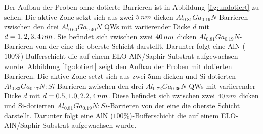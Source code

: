 \noindent 
Der Aufbau der Proben ohne dotierte Barrieren ist in Abbildung \ref{fig:undotiert} zu sehen.
Die aktive Zone setzt sich aus zwei $5 \thinspace nm$ dicken $ Al_{0.81}Ga_{0.19}N$-Barrieren zwischen den drei $ Al_{0.60}Ga_{0.40}N$ QWs mit variierender Dicke $d$ mit $d=1,2,3,4 \thinspace nm$. Sie befindet sich zwischen zwei $40 \thinspace nm$ dicken $ Al_{0.81}Ga_{0.19}N$-Barrieren von der eine die oberste Schicht darstellt. Darunter folgt eine AlN ($100\%$)-Bufferschicht die auf einem ELO-AlN/Saphir Substrat aufgewachsen wurde. 
\newline
Abbildung \ref{fig:dotiert} zeigt den Aufbau der Proben mit dotierten Barrieren. Die aktive Zone setzt sich aus zwei $5$nm dicken und Si-dotierten $ Al_{0.83}Ga_{0.17}N:Si$-Barrieren zwischen den drei $ Al_{0.72}Ga_{0.36}N$ QWs mit variierender Dicke $d$ mit $d=0.5,1.0,2.2,4 \thinspace nm$. Diese befindet sich zwischen zwei $40 \thinspace nm$ dicken und Si-dotierten $ Al_{0.81}Ga_{0.19}N:Si$-Barrieren von der eine die oberste Schicht darstellt. Darunter folgt eine AlN ($100\%$)-Bufferschicht die auf einem ELO-AlN/Saphir Substrat aufgewachsen wurde. 
